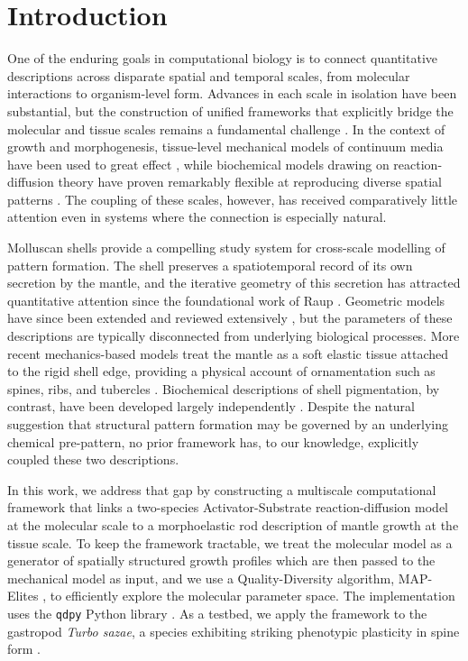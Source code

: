 \section{Introduction}

One of the enduring goals in computational biology is to connect quantitative descriptions across disparate spatial and temporal scales, from molecular interactions to organism-level form. Advances in each scale in isolation have been substantial, but the construction of unified frameworks that explicitly bridge the molecular and tissue scales remains a fundamental challenge \cite{goriely2017mathematics}. In the context of growth and morphogenesis, tissue-level mechanical models of continuum media have been used to great effect \cite{moulton2013morphoelastic,moulton2020morphoelastic}, while biochemical models drawing on reaction-diffusion theory have proven remarkably flexible at reproducing diverse spatial patterns \cite{turing1952chemical,gierer1972theory,meinhardt1987model,pueyo2018reactiondiffusion}. The coupling of these scales, however, has received comparatively little attention even in systems where the connection is especially natural.

Molluscan shells provide a compelling study system for cross-scale modelling of pattern formation. The shell preserves a spatiotemporal record of its own secretion by the mantle, and the iterative geometry of this secretion has attracted quantitative attention since the foundational work of Raup \cite{raup1961geometric,raup1966geometric}. Geometric models have since been extended and reviewed extensively \cite{gerber2017geometry,urdy2011recapitulation}, but the parameters of these descriptions are typically disconnected from underlying biological processes. More recent mechanics-based models treat the mantle as a soft elastic tissue attached to the rigid shell edge, providing a physical account of ornamentation such as spines, ribs, and tubercles \cite{chirat2013mechanical,moulton2015morpho,erlich2016morphomechanics}. Biochemical descriptions of shell pigmentation, by contrast, have been developed largely independently \cite{fowler1992modeling,meinhardt1995algorithmic,boettiger2009neural}. Despite the natural suggestion that structural pattern formation may be governed by an underlying chemical pre-pattern, no prior framework has, to our knowledge, explicitly coupled these two descriptions.

In this work, we address that gap by constructing a multiscale computational framework that links a two-species Activator-Substrate reaction-diffusion model at the molecular scale to a morphoelastic rod description of mantle growth at the tissue scale. To keep the framework tractable, we treat the molecular model as a generator of spatially structured growth profiles which are then passed to the mechanical model as input, and we use a Quality-Diversity algorithm, MAP-Elites \cite{mouret2015illuminating,cully2015robots}, to efficiently explore the molecular parameter space. The implementation uses the \texttt{qdpy} Python library \cite{cazenille2018qdpy}. As a testbed, we apply the framework to the gastropod \textit{Turbo sazae}, a species exhibiting striking phenotypic plasticity in spine form \cite{fukuda2017nomenclature,tanaka2018phenotypic,hamm2008environmental}.

